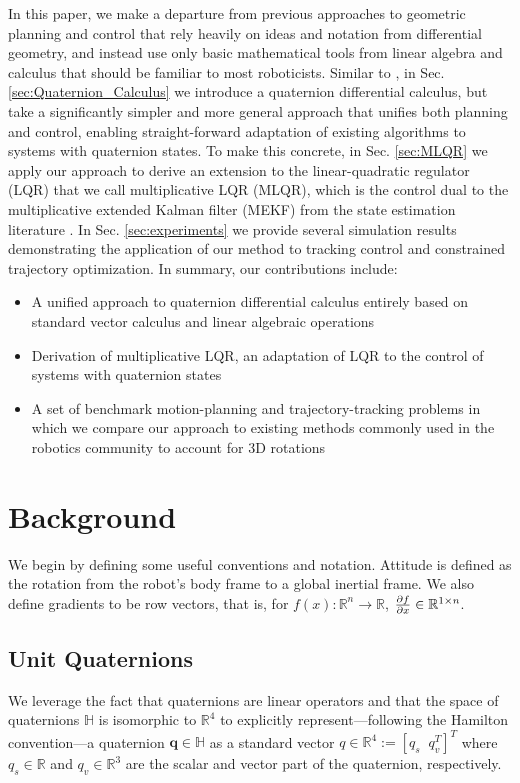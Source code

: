 \documentclass{svproc}
\newcommand{\R}{\mathbb{R}}
\newcommand{\q}{\textbf{q}}
\begin{document}
    In this paper, we make a departure from previous approaches to geometric planning and control that rely heavily on ideas and notation from differential geometry, and instead use only basic mathematical tools from linear algebra and calculus that should be familiar to most roboticists. Similar to \cite{Mandic2011,Xu2016}, in Sec. \ref{sec:Quaternion_Calculus} we introduce a quaternion differential calculus, but take a significantly simpler and more general approach that unifies both planning and control, enabling straight-forward adaptation of existing algorithms to systems with quaternion states. To make this concrete, in Sec. \ref{sec:MLQR} we apply our approach to derive an extension to the linear-quadratic regulator (LQR) that we call multiplicative LQR (MLQR), which is the control dual to the multiplicative extended Kalman filter (MEKF) from the state estimation literature \cite{markley2014fundamentals}. In Sec. \ref{sec:experiments} we provide several simulation results demonstrating the application of our method to tracking control and constrained trajectory optimization.
    In summary, our contributions include:
    \begin{itemize}
        \item A unified approach to quaternion differential calculus entirely based on standard vector calculus and linear algebraic operations
        \item Derivation of multiplicative LQR, an adaptation of LQR to the control of systems with quaternion states
        \item A set of benchmark motion-planning and trajectory-tracking problems in which we compare our approach to existing methods commonly used in the robotics community to account for 3D rotations
    \end{itemize}


\section{Background}
    We begin by defining some useful conventions and notation. Attitude is defined as the rotation from the robot's body frame to a global inertial frame. We also define gradients to be row vectors, that is, for $f(x) : \R^n \to \R$, $\pdv{f}{x} \in \R^{1\times n}$.
    
    \subsection{Unit Quaternions} \label{sec:quaternions}
        We leverage the fact that quaternions are linear operators and that the space of quaternions $\mathbb{H}$ is isomorphic to $\R^4$ to explicitly represent---following the Hamilton convention---a quaternion $\q \in \mathbb{H}$ as a standard vector $q \in \R^4 := [q_s \;\; q_v^T]^T$ where $q_s \in \R$ and $q_v \in \R^3$ are the scalar and vector part of the quaternion, respectively.
        
\end{document}
